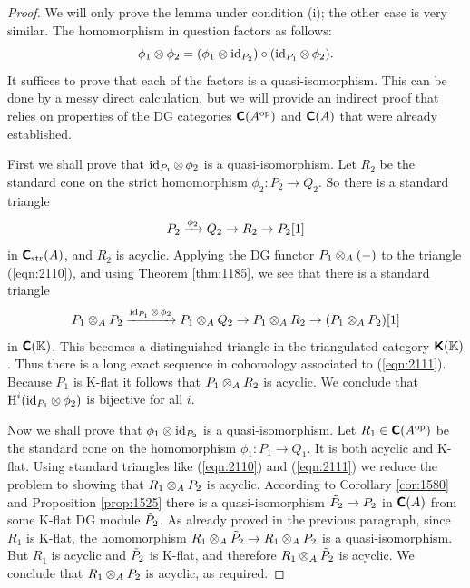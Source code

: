 \begin{proof}
We will only prove the lemma under condition (i); the other 
case is very similar. The homomorphism in question factors as follows:
\[ \phi_1 \otimes \phi_2 = (\phi_1 \otimes \operatorname{id}_{P_2}) \circ 
(\operatorname{id}_{P_1} \otimes \, \phi_2 ) . \]
It suffices to prove that each of the factors is a quasi-isomorphism. This can 
be done by a messy direct calculation, but we will provide an indirect proof 
that relies on properties of the DG categories  
$\boldsymbol{\mathsf{C}}(A^{\mathrm{op}})$ and $\boldsymbol{\mathsf{C}}(A)$ that 
were already established. 

First we shall prove that $\operatorname{id}_{P_1} \otimes \, \phi_2$ is a quasi-isomorphism.
Let $R_2$ be the standard cone on the strict homomorphism 
$\phi_2 : P_2 \to Q_2$. So there is a standard triangle 
\begin{equation} \label{eqn:2110}
P_2 \xrightarrow{\phi_2} Q_2 \to R_2 \to P_2[1]
\end{equation}
in $\boldsymbol{\mathsf{C}}_{\mathrm{str}}(A)$, and $R_2$ is acyclic. 
Applying the DG functor $P_1 \otimes_A (-)$ to the triangle (\ref{eqn:2110}), and 
using Theorem \ref{thm:1185}, we see that there is a standard triangle 
\begin{equation} \label{eqn:2111}
 P_1 \otimes_A P_2 \xrightarrow{\operatorname{id}_{P_1} \otimes \, \phi_2} P_1 \otimes_A Q_2 \to P_1 \otimes_A 
R_2 \to (P_1 \otimes_A P_2)[1]
\end{equation}
in $\boldsymbol{\mathsf{C}}(\mathbb{K})$. This becomes a distinguished triangle in the triangulated 
category $\boldsymbol{\mathsf{K}}(\mathbb{K})$. Thus there is a long exact sequence in cohomology 
associated to (\ref{eqn:2111}). Because $P_1$ is K-flat it follows that 
$P_1 \otimes_A R_2$ is acyclic. We conclude that 
$ \operatorname{H}^i(\operatorname{id}_{P_1} \otimes \, \phi_2)$
is bijective for all $i$. 

Now we shall prove that $\phi_1 \otimes \operatorname{id}_{P_2}$ is a quasi-isomorphism.
Let $R_1 \in \boldsymbol{\mathsf{C}}(A^{\mathrm{op}})$ be the standard cone on the homomorphism 
$\phi_1 : P_1 \to Q_1$. It is both acyclic and K-flat. 
Using standard triangles like (\ref{eqn:2110}) and (\ref{eqn:2111}) we reduce 
the problem to showing that $R_1 \otimes_A P_2$ is acyclic. 
According to Corollary \ref{cor:1580} and Proposition \ref{prop:1525} there is 
a quasi-isomorphism 
$\tilde{P}_2 \to P_2$ in $\boldsymbol{\mathsf{C}}(A)$ from some K-flat DG module $\tilde{P}_2$. 
As already proved in the previous paragraph, since $R_1$ is K-flat, the 
homomorphism
$R_1 \otimes_A \tilde{P}_2 \to R_1 \otimes_A P_2$
is a quasi-isomorphism. But $R_1$ is acyclic and $\tilde{P}_2$ is K-flat, and 
therefore
$R_1 \otimes_A \tilde{P}_2$ is acyclic. We conclude that 
$R_1 \otimes_A P_2$ is acyclic, as required. 
\end{proof}

